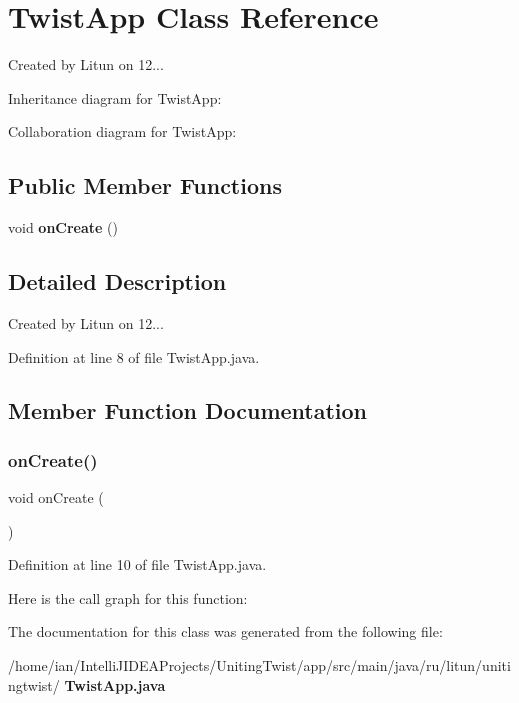 \section{Twist\+App Class Reference}
\label{classsf_1_1unitingtwist_1_1_twist_app}


Created by Litun on 12...  




Inheritance diagram for Twist\+App\+:


Collaboration diagram for Twist\+App\+:
\subsection*{Public Member Functions}
\begin{DoxyCompactItemize}
\item 
void \textbf{ on\+Create} ()
\end{DoxyCompactItemize}


\subsection{Detailed Description}
Created by Litun on 12... 

Definition at line 8 of file Twist\+App.\+java.



\subsection{Member Function Documentation}
\mbox{\label{classsf_1_1unitingtwist_1_1_twist_app_a664c1cf87598f75d568f4275bd61e074}} 
\subsubsection{on\+Create()}
{\footnotesize\ttfamily void on\+Create (\begin{DoxyParamCaption}{ }\end{DoxyParamCaption})}



Definition at line 10 of file Twist\+App.\+java.

Here is the call graph for this function\+:


The documentation for this class was generated from the following file\+:\begin{DoxyCompactItemize}
\item 
/home/ian/\+Intelli\+J\+I\+D\+E\+A\+Projects/\+Uniting\+Twist/app/src/main/java/ru/litun/unitingtwist/\textbf{ Twist\+App.\+java}\end{DoxyCompactItemize}
